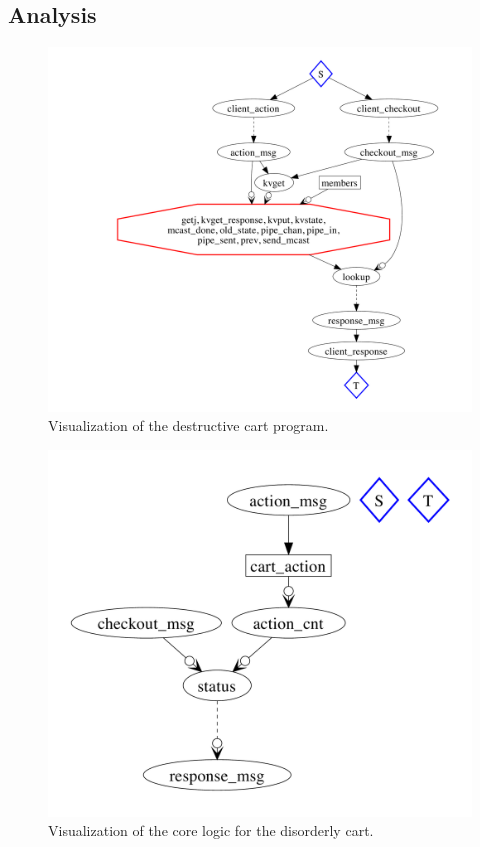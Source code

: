 \subsection{Analysis}

\begin{figure}[t]
\centering
\includegraphics[width=1.1\linewidth]{fig/destructive_kvs.pdf}
\vspace{-10pt}
\caption{Visualization of the destructive cart program.}
\label{fig:pdg-destructive-kvs-analysis}
\vspace{-2pt}
\end{figure}

\begin{figure}[t]
\centering
\includegraphics[width=0.8\linewidth]{fig/disorderly_base.pdf}
\vspace{-10pt}
\caption{Visualization of the core logic for the disorderly cart.}
\label{fig:pdg-disorderly-base}
\vspace{-2pt}
\end{figure}


